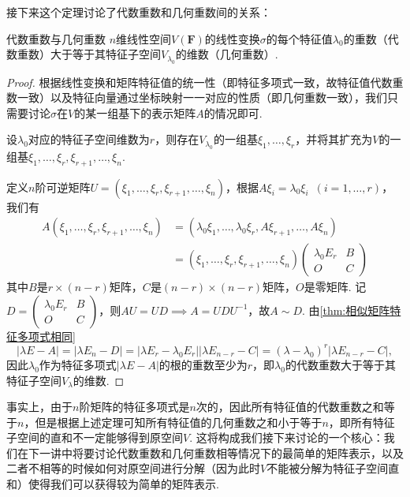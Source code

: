 接下来这个定理讨论了代数重数和几何重数间的关系：
\begin{theorem}{}{代数重数与几何重数}
    $n$维线性空间$V(\mathbf{F})$的线性变换$\sigma$的每个特征值$\lambda_0$的重数（代数重数）大于等于其特征子空间$V_{\lambda_0}$的维数（几何重数）.
\end{theorem}

\begin{proof}
    根据线性变换和矩阵特征值的统一性（即特征多项式一致，故特征值代数重数一致）以及特征向量通过坐标映射一一对应的性质（即几何重数一致），我们只需要讨论$\sigma$在$V$的某一组基下的表示矩阵$A$的情况即可.

    设$\lambda_0$对应的特征子空间维数为$r$，则存在$V_{\lambda_0}$的一组基$\xi_1,\ldots,\xi_r$，并将其扩充为$V$的一组基$\xi_1,\ldots,\xi_r,\xi_{r+1},\ldots,\xi_n$.

    定义$n$阶可逆矩阵$U=(\xi_1,\ldots,\xi_r,\xi_{r+1},\ldots,\xi_n)$，根据$A\xi_i=\lambda_0\xi_i\enspace(i=1,\ldots,r)$，我们有
    \begin{align*}
        A(\xi_1,\ldots,\xi_r,\xi_{r+1},\ldots,\xi_n) & = (\lambda_0\xi_1,\ldots,\lambda_0\xi_r,A\xi_{r+1},\ldots,A\xi_n) \\
                                                     & = (\xi_1,\ldots,\xi_r,\xi_{r+1},\ldots,\xi_n)
        \begin{pmatrix}
            \lambda_0 E_r & B \\ O & C
        \end{pmatrix}
    \end{align*}
    其中$B$是$r\times(n-r)$矩阵，$C$是$(n-r)\times(n-r)$矩阵，$O$是零矩阵. 记$D=\begin{pmatrix}
            \lambda_0 E_r & B \\ O & C
        \end{pmatrix}$，则$AU=UD\implies A=UDU^{-1}$，故$A\sim D$. 由\autoref{thm:相似矩阵特征多项式相同}
    \[|\lambda E-A|=|\lambda E_n-D|=|\lambda E_r-\lambda_0 E_r||\lambda E_{n-r}-C|=(\lambda-\lambda_0)^r|\lambda E_{n-r}-C|,\]因此$\lambda_0$作为特征多项式$|\lambda E-A|$的根的重数至少为$r$，即$\lambda_0$的代数重数大于等于其特征子空间$V_{\lambda}$的维数.
\end{proof}

事实上，由于$n$阶矩阵的特征多项式是$n$次的，因此所有特征值的代数重数之和等于$n$，但是根据上述定理可知所有特征值的几何重数之和小于等于$n$，即所有特征子空间的直和不一定能够得到原空间$V$. 这将构成我们接下来讨论的一个核心：我们在下一讲中将要讨论代数重数和几何重数相等情况下的最简单的矩阵表示，以及二者不相等的时候如何对原空间进行分解（因为此时$V$不能被分解为特征子空间直和）使得我们可以获得较为简单的矩阵表示.

